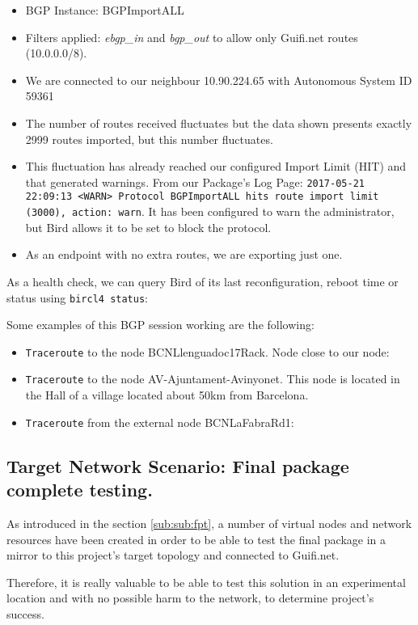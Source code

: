 \begin{itemize}
    \item BGP Instance: BGPImportALL
    \item Filters applied: \textit{ebgp\_in} and \textit{bgp\_out} to allow only Guifi.net routes (10.0.0.0/8).
    \item We are connected to our neighbour 10.90.224.65 with Autonomous System ID 59361
    \item  The number of routes received fluctuates but the data shown presents exactly 2999 routes imported, but this number fluctuates.
    \item This fluctuation has already reached our configured Import Limit (HIT) and that generated warnings.
    From our Package's Log Page:
    \texttt{2017-05-21 22:09:13 <WARN> Protocol BGPImportALL hits route import limit (3000), action: warn}. It has been configured to warn the administrator, but Bird allows it to be set to block the protocol.
    \item As an endpoint with no extra routes, we are exporting just one.
\end{itemize}

As a health check, we can query Bird of its last reconfiguration, reboot time or status using \texttt{bircl4 status}:



Some examples of this BGP session working are the following:

\begin{itemize}
    \item \texttt{Traceroute} to the node BCNLlenguadoc17Rack. Node close to our node:

    \item \texttt{Traceroute} to the node AV-Ajuntament-Avinyonet. This node is located in the Hall of a village located about 50km from Barcelona.

    \item \texttt{Traceroute} from the external node BCNLaFabraRd1:

\end{itemize}


\subsection{Target Network Scenario: Final package complete testing.}
As introduced in the section \ref{sub:sub:fpt}, a number of virtual nodes and network resources have been created in order to be able to test the final package in a mirror to this project's target topology and connected to Guifi.net.

Therefore, it is really valuable to be able to test this solution in an experimental location and with no possible harm to the network, to determine project's success.










